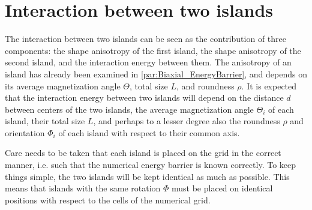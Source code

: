 \documentclass[11pt,a4paper,english]{article}
\begin{document}
\section{Interaction between two islands}
The interaction between two islands can be seen as the contribution of three components: the shape anisotropy of the first island, the shape anisotropy of the second island, and the interaction energy between them. The anisotropy of an island has already been examined in \cref{par:Biaxial_EnergyBarrier}, and depends on its average magnetization angle $\Theta$, total size $L$, and roundness $\rho$. It is expected that the interaction energy between two islands will depend on the distance $d$ between centers of the two islands, the average magnetization angle $\Theta_i$ of each island, their total size $L$, and perhaps to a lesser degree also the roundness $\rho$ and orientation $\Phi_i$ of each island with respect to their common axis. \par
Care needs to be taken that each island is placed on the grid in the correct manner, i.e. such that the numerical energy barrier is known correctly. To keep things simple, the two islands will be kept identical as much as possible. This means that islands with the same rotation $\Phi$ must be placed on identical positions with respect to the cells of the numerical grid.
\end{document}
